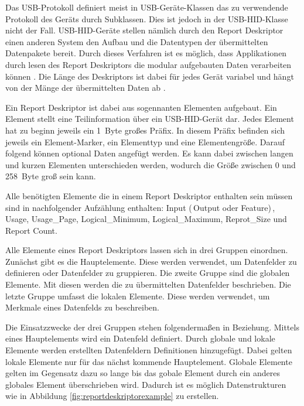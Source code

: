 Das USB-Protokoll definiert meist in USB-Geräte-Klassen das zu verwendende Protokoll des Geräts durch Subklassen. Dies ist jedoch in der USB-\acs{HID}-Klasse nicht der Fall. USB-\acs{HID}-Geräte stellen nämlich durch den Report Deskriptor einen anderen System den Aufbau und die Datentypen der übermittelten Datenpakete bereit. \cite[S.~8]{usbHIDS} Durch dieses Verfahren ist es möglich, dass Applikationen durch lesen des Report Deskriptors die modular aufgebauten Daten verarbeiten können \cite[S.~24]{usbHIDS}. Die Länge des Deskriptors ist dabei für jedes Gerät variabel und hängt von der Mänge der übermittelten Daten ab \cite[S.~23]{usbHIDS}.

Ein Report Deskriptor ist dabei aus sogennanten Elementen aufgebaut. Ein Element stellt eine Teilinformation über ein USB-\acs{HID}-Gerät dar. Jedes Element hat zu beginn jeweils ein 1~Byte großes Präfix. In diesem Präfix befinden sich jeweils ein Element-Marker, ein Elementtyp und eine Elementengröße. Darauf folgend können optional Daten angefügt werden. Es kann dabei zwischen langen und kurzen Elementen unterschieden werden, wodurch die Größe zwischen 0 und 258~Byte groß sein kann. \cite[S.~14]{usbHIDS}

Alle benötigten Elemente die in einem Report Deskriptor enthalten sein müssen sind in nachfolgender Aufzählung enthalten: Input (\,Output oder Feature)\,, Usage, Usage\_Page, Logical\_Minimum, Logical\_Maximum, Reprot\_Size und Report Count. \cite[S.~24]{usbHIDS}

Alle Elemente eines Report Deskriptors lassen sich in drei Gruppen einordnen. Zunächst gibt es die Hauptelemente. Diese werden verwendet, um Datenfelder zu definieren oder Datenfelder zu gruppieren. Die zweite Gruppe sind die globalen Elemente. Mit diesen werden die zu übermittelten Datenfelder beschrieben. Die letzte Gruppe umfasst die lokalen Elemente. Diese werden verwendet, um Merkmale eines Datenfelds zu beschreiben. \cite[S.~16, S.~28, S.~35]{usbHIDS}

Die Einsatzzwecke der drei Gruppen stehen folgendermaßen in Beziehung. Mittels eines Hauptelements wird ein Datenfeld definiert. Durch globale und lokale Elemente werden erstellten Datenfeldern Definitionen hinzugefügt. Dabei gelten lokale Elemente nur für das nächst kommende Hauptelement. Globale Elemente gelten im Gegensatz dazu so lange bis das gobale Element durch ein anderes globales Element überschrieben wird. Dadurch ist es möglich Datenstrukturen wie in Abbildung \ref{fig:reportdeskriptorexample} zu erstellen. \cite[S.~24]{usbHIDS}

